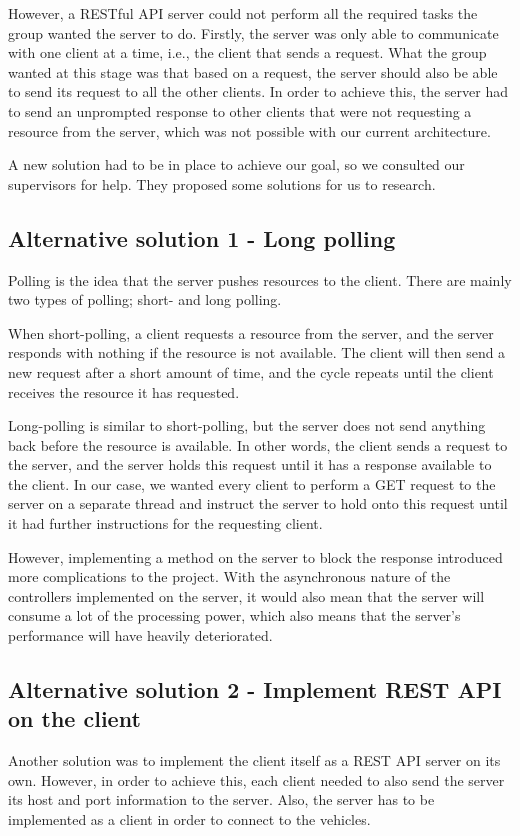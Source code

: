 However, a RESTful API server could not perform all the required tasks the group wanted the server to do. Firstly, the server was only able to communicate with one client at a time, i.e., the client that sends a request. What the group wanted at this stage was that based on a request, the server should also be able to send its request to all the other clients. In order to achieve this, the server had to send an unprompted response to other clients that were not requesting a resource from the server, which was not possible with our current architecture.

A new solution had to be in place to achieve our goal, so we consulted our supervisors for help. They proposed some solutions for us to research. 

\subsection{Alternative solution 1 - Long polling}
Polling is the idea that the server pushes resources to the client. There are mainly two types of polling; short- and long polling. 

When short-polling, a client requests a resource from the server, and the server responds with nothing if the resource is not available. The client will then send a new request after a short amount of time, and the cycle repeats until the client receives the resource it has requested.

Long-polling is similar to short-polling, but the server does not send anything back before the resource is available. In other words, the client sends a request to the server, and the server holds this request until it has a response available to the client. In our case, we wanted every client to perform a GET request to the server on a separate thread and instruct the server to hold onto this request until it had further instructions for the requesting client.

However, implementing a method on the server to block the response introduced more complications to the project. With the asynchronous nature of the controllers implemented on the server, it would also mean that the server will consume a lot of the processing power, which also means that the server's performance will have heavily deteriorated.

\subsection{Alternative solution 2 - Implement REST API on the client}
Another solution was to implement the client itself as a REST API server on its own. However, in order to achieve this, each client needed to also send the server its host and port information to the server. Also, the server has to be implemented as a client in order to connect to the vehicles.

